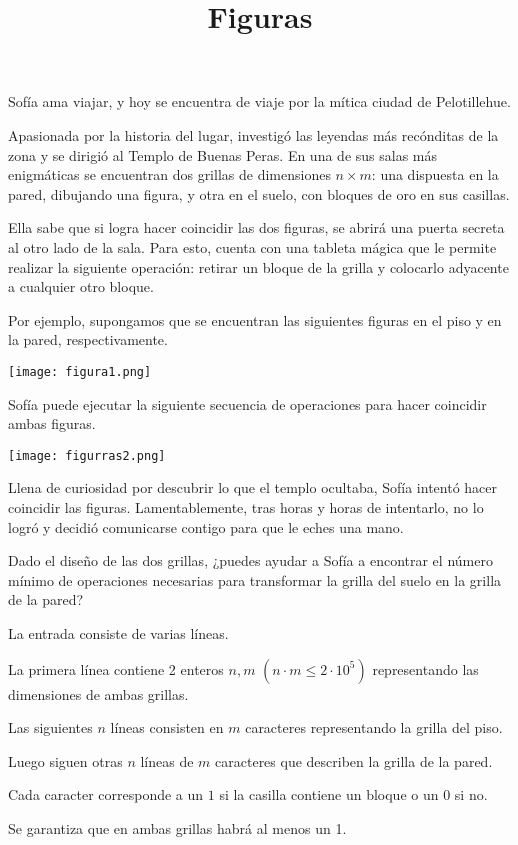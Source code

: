\documentclass{oci}
\title{Figuras}
\begin{document}
\begin{problemDescription}
Sofía ama viajar, y hoy se encuentra de viaje por la mítica ciudad de Pelotillehue.

Apasionada por la historia del lugar, investigó las leyendas más recónditas de la zona y se dirigió al Templo de Buenas Peras. En una de sus salas más enigmáticas se encuentran dos grillas de dimensiones $n \times m$: una dispuesta en la pared, dibujando una figura, y otra en el suelo, con bloques de oro en sus casillas.

Ella sabe que si logra hacer coincidir las dos figuras, se abrirá una puerta secreta al otro lado de la sala. Para esto, cuenta con una tableta mágica que le permite realizar la siguiente operación: retirar un bloque de la grilla y colocarlo adyacente a cualquier otro bloque.

Por ejemplo, supongamos que se encuentran las siguientes figuras en el piso y en la pared, respectivamente.

\begin{center}
    \texttt{[image: figura1.png]}
\end{center}

Sofía puede ejecutar la siguiente secuencia de operaciones para hacer coincidir ambas figuras.

\begin{center}
    \texttt{[image: figurras2.png]}
\end{center}

Llena de curiosidad por descubrir lo que el templo ocultaba, Sofía intentó hacer coincidir las figuras. Lamentablemente, tras horas y horas de intentarlo, no lo logró y decidió comunicarse contigo para que le eches una mano.

Dado el diseño de las dos grillas, ¿puedes ayudar a Sofía a encontrar el número mínimo de operaciones necesarias para transformar la grilla del suelo en la grilla de la pared?

\end{problemDescription}

\begin{inputDescription}
La entrada consiste de varias líneas.

La primera línea contiene 2 enteros $n, m$ $(n \cdot m \leq 2 \cdot 10^5)$ representando las dimensiones de ambas grillas.

Las siguientes $n$ líneas consisten en $m$ caracteres representando la grilla del piso.

Luego siguen otras $n$ líneas de $m$ caracteres que describen la grilla de la pared.

Cada caracter corresponde a un $1$ si la casilla contiene un bloque o un $0$ si no.

Se garantiza que en ambas grillas habrá al menos un 1.
\end{inputDescription}
\end{document}
